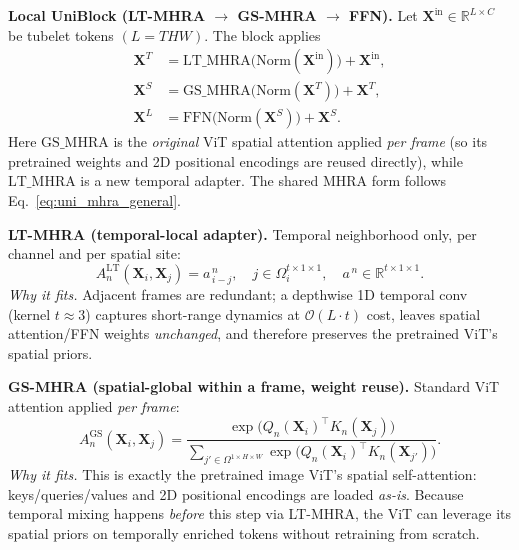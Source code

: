 \begin{enrichment}
\begin{enrichment}
        \textbf{Local UniBlock (LT-MHRA \(\rightarrow\) GS-MHRA \(\rightarrow\) FFN).} Let \(\bm{X}^{\text{in}}\!\in\!\mathbb{R}^{L\times C}\) be tubelet tokens \((L=T\!H\!W)\). The block applies
        \begin{align}
            \bm{X}^{T} &= \mathrm{LT\_MHRA}\big(\mathrm{Norm}(\bm{X}^{\text{in}})\big) + \bm{X}^{\text{in}}, \label{eq:uv2_lt}\\
            \bm{X}^{S} &= \mathrm{GS\_MHRA}\big(\mathrm{Norm}(\bm{X}^{T})\big) + \bm{X}^{T}, \label{eq:uv2_gs}\\
            \bm{X}^{L} &= \mathrm{FFN}\big(\mathrm{Norm}(\bm{X}^{S})\big) + \bm{X}^{S}. \label{eq:uv2_ffn}
        \end{align}
        Here \(\mathrm{GS\_MHRA}\) is the \emph{original} ViT spatial attention applied \emph{per frame} (so its pretrained weights and 2D positional encodings are reused directly), while \(\mathrm{LT\_MHRA}\) is a new temporal adapter. The shared MHRA form follows Eq.~\eqref{eq:uni_mhra_general}.
        
        \textbf{LT-MHRA (temporal-local adapter).} Temporal neighborhood only, per channel and per spatial site:
        \begin{equation}
            A^{\text{LT}}_{n}(\bm{X}_i,\bm{X}_j)=a^{\,n}_{\,i-j},\quad j\in\Omega^{t\times 1\times 1}_i,\quad a^{\,n}\!\in\!\mathbb{R}^{t\times 1\times 1}.
            \label{eq:uv2_lt_aff}
        \end{equation}
        \emph{Why it fits.} Adjacent frames are redundant; a depthwise 1D temporal conv (kernel \(t\!\approx\!3\)) captures short-range dynamics at \(\mathcal{O}(L\cdot t)\) cost, leaves spatial attention/FFN weights \emph{unchanged}, and therefore preserves the pretrained ViT’s spatial priors.
        
        \textbf{GS-MHRA (spatial-global within a frame, weight reuse).} Standard ViT attention applied \emph{per frame}:
        \begin{equation}
            A^{\text{GS}}_{n}(\bm{X}_i,\bm{X}_j)=
            \frac{\exp\big(Q_n(\bm{X}_i)^\top K_n(\bm{X}_j)\big)}
            {\sum_{j'\in\Omega^{1\times H\times W}}\exp\big(Q_n(\bm{X}_i)^\top K_n(\bm{X}_{j'})\big)}.
            \label{eq:uv2_gs_aff}
        \end{equation}
        \emph{Why it fits.} This is exactly the pretrained image ViT’s spatial self-attention: keys/queries/values and 2D positional encodings are loaded \emph{as-is}. Because temporal mixing happens \emph{before} this step via LT-MHRA, the ViT can leverage its spatial priors on temporally enriched tokens without retraining from scratch.
        

\end{enrichment}
\end{enrichment}
